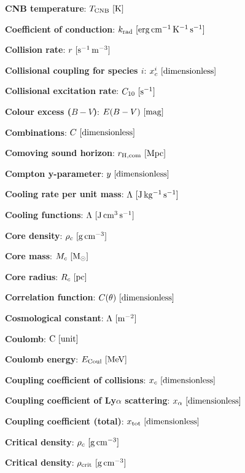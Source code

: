 \documentclass[a4paper,10pt]{article}
\begin{document}
{\noindent}\textbf{CNB temperature}: $T_\mathrm{CNB} ~ [{\rm K}]$

{\noindent}\textbf{Coefficient of conduction}: $k_{\rm rad} ~ [{\rm erg\,cm^{-1}\,K^{-1}\,s^{-1}}]$

{\noindent}\textbf{Collision rate}: $r ~ [{\rm s^{-1}\,m^{-3}}]$

{\noindent}\textbf{Collisional coupling for species $i$}: $x_c^i ~ [{\rm dimensionless}]$

{\noindent}\textbf{Collisional excitation rate}: $C_{10} ~ [{\rm s^{-1}}]$

{\noindent}\textbf{Colour excess ($B-V$)}: $E(B-V) ~ [{\rm mag}]$

{\noindent}\textbf{Combinations}: $C ~ [{\rm dimensionless}]$

{\noindent}\textbf{Comoving sound horizon}: $r_\mathrm{H,com} ~ [{\rm Mpc}]$

{\noindent}\textbf{Compton y-parameter}: $y ~ [{\rm dimensionless}]$

{\noindent}\textbf{Cooling rate per unit mass}: $\Lambda ~ [{\rm J\,kg^{-1}\,s^{-1}}]$

{\noindent}\textbf{Cooling functions}: $\Lambda ~ [{\rm J\,cm^3\,s^{-1}}]$

{\noindent}\textbf{Core density}: $\rho_c ~ [{\rm g\,cm^{-3}}]$

{\noindent}\textbf{Core mass}: $M_c ~ [{\rm M_\odot}]$

{\noindent}\textbf{Core radius}: $R_c ~ [{\rm pc}]$

{\noindent}\textbf{Correlation function}: $C(\theta) ~ [{\rm dimensionless}]$

{\noindent}\textbf{Cosmological constant}: $\Lambda ~ [{\rm m^{-2}}]$

{\noindent}\textbf{Coulomb}: ${\rm C} ~ [{\rm unit}]$

{\noindent}\textbf{Coulomb energy}: $E_{\rm Coul} ~ [{\rm MeV}]$

{\noindent}\textbf{Coupling coefficient of collisions}: $x_c ~ [{\rm dimensionless}]$

{\noindent}\textbf{Coupling coefficient of Ly$\alpha$ scattering}: $x_\alpha ~ [{\rm dimensionless}]$

{\noindent}\textbf{Coupling coefficient (total)}: $x_\mathrm{tot} ~ [{\rm dimensionless}]$

{\noindent}\textbf{Critical density}: $\rho_c ~ [{\rm g\,cm^{-3}}]$

{\noindent}\textbf{Critical density}: $\rho_\mathrm{crit} ~ [{\rm g\,cm^{-3}}]$
\end{document}

